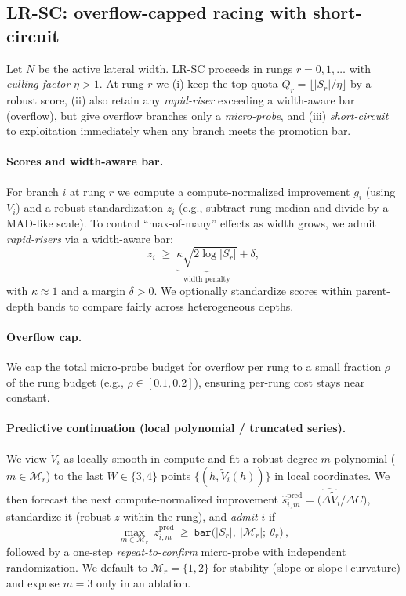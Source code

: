 \documentclass{article}
\begin{document}
\vspace{-0.5em}
\subsection{LR-SC: overflow-capped racing with short-circuit}
\label{sec:lrscr}

Let $N$ be the active lateral width.
LR-SC proceeds in rungs $r=0,1,\dots$ with \emph{culling factor} $\eta>1$.
At rung $r$ we (i) keep the top quota $Q_r=\lfloor |S_r|/\eta \rfloor$ by a robust score, (ii) also retain any \emph{rapid-riser} exceeding a width-aware bar (overflow), but give overflow branches only a \emph{micro-probe}, and (iii) \emph{short-circuit} to exploitation immediately when any branch meets the promotion bar.

\paragraph{Scores and width-aware bar.}
For branch $i$ at rung $r$ we compute a compute-normalized improvement $g_i$ (using $V_i$) and a robust standardization $z_i$ (e.g., subtract rung median and divide by a MAD-like scale).
To control ``max-of-many'' effects as width grows, we admit \emph{rapid-risers} via a width-aware bar:
\[
z_i \;\ge\; \underbrace{\kappa \sqrt{2\log |S_r|}}_{\text{width penalty}} + \delta,
\]
with $\kappa\approx 1$ and a margin $\delta>0$.
We optionally standardize scores within parent-depth bands to compare fairly across heterogeneous depths.

\paragraph{Overflow cap.}
We cap the total micro-probe budget for overflow per rung to a small fraction $\rho$ of the rung budget (e.g., $\rho\in[0.1,0.2]$), ensuring per-rung cost stays near constant.


\paragraph{Predictive continuation (local polynomial / truncated series).}
We view $\tilde V_i$ as locally smooth in compute and fit a robust degree-$m$ polynomial ($m\!\in\!\mathcal{M}_r$)
to the last $W\in\{3,4\}$ points $\{(h,\tilde V_i(h))\}$ in local coordinates.
We then forecast the next compute-normalized improvement
$\widehat{s}^{\mathrm{pred}}_{i,m}=\big(\widehat{\Delta \tilde V}_i / \Delta C\big)$,
standardize it (robust $z$ within the rung), and \emph{admit} $i$ if
\begin{equation}
\max_{m\in\mathcal{M}_r}\ z^{\mathrm{pred}}_{i,m}\ \ge\ \texttt{bar}\!\big(|S_r|,\ |\mathcal{M}_r|;\ \theta_r\big)\,,
\end{equation}
followed by a one-step \emph{repeat-to-confirm} micro-probe with independent randomization.
We default to $\mathcal{M}_r{=}\{1,2\}$ for stability (slope or slope+curvature) and expose $m{=}3$ only in an ablation.
\end{document}

